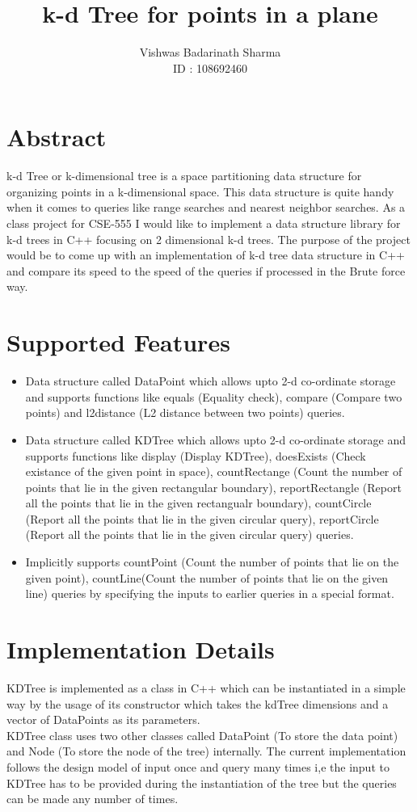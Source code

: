 \documentclass[11pt]{article}
\title{\textbf{k-d Tree for points in a plane}}
\author{Vishwas Badarinath Sharma\\
		ID : 108692460}
\date{}
\begin{document}
\maketitle

\section{Abstract}

k-d Tree or k-dimensional tree is a space partitioning data structure for
organizing points in a k-dimensional space. This data structure is quite handy
when it comes to queries like range searches and nearest neighbor searches. As a class project for CSE-555 I would like to implement a data structure library for k-d trees in C++ focusing on 2 dimensional k-d trees. The purpose of the project would be to come up with an implementation of k-d tree data structure in C++ and compare its speed to the speed of the queries if processed in the Brute force way.

\section{Supported Features}

\begin{itemize}
  \item Data structure called DataPoint which allows upto 2-d co-ordinate storage and supports functions like equals (Equality check), compare (Compare two points) and l2distance (L2 distance between two points) queries. 
  \item Data structure called KDTree which allows upto 2-d co-ordinate storage and supports functions like display (Display KDTree), doesExists (Check existance of the given point in space), countRectange (Count the number of points that lie in the given rectangular boundary), reportRectangle (Report all the points that lie in the given rectangualr boundary), countCircle (Report all the points that lie in the given circular query), reportCircle (Report all the points that lie in the given circular query) queries.
  \item Implicitly supports countPoint (Count the number of points that lie on the given point), countLine(Count the number of points that lie on the given line) queries by specifying the inputs to earlier queries in a special format.
\end{itemize}

\section{Implementation Details}
\indent KDTree is implemented as a class in C++ which can be instantiated in a simple way by the usage of its constructor which takes the kdTree dimensions and a vector of DataPoints as its parameters.\\
\indent KDTree class uses two other classes called DataPoint (To store the data point) and Node (To store the node of the tree) internally. The current implementation follows the design model of input once and query many times i,e the input to KDTree has to be provided during the instantiation of the tree but the queries can be made any number of times.
\end{document}
